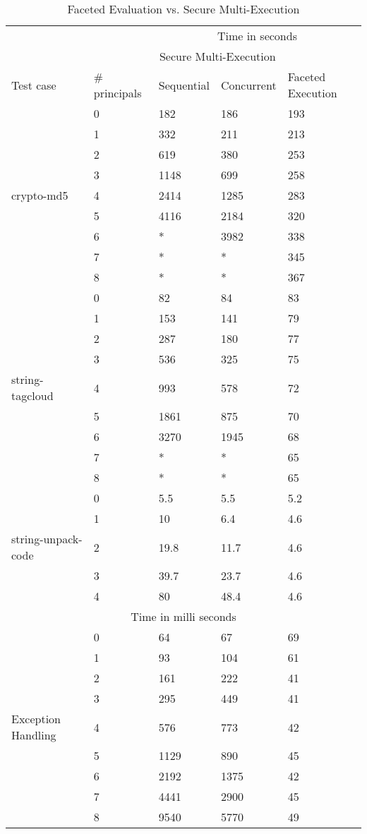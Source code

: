 \begin{table}
\begin{tabular}{ |p{3cm}|p{2cm}|p{2cm}|p{2cm}|p{3cm}| }
 \hline
  	 & 	& \multicolumn{3}{|c|}{Time in seconds} \\ \cline{3-5}
  	&	&\multicolumn{2}{|c|}{\footnotesize Secure Multi-Execution}& \\ \cline{3-4}
  	 \footnotesize Test case & \footnotesize \# principals	&\footnotesize Sequential &\footnotesize Concurrent&	\footnotesize Faceted Execution\\
 \hline
    			&0    	&182		&186		&193\\
 			&1  		&332   	&211		&213\\
 			&2 		&619		&380		&253\\
  			&3 		&1148	&699		&258\\
 \footnotesize crypto-md5	&4  		&2414	&1285	&283\\
 			&5  		&4116   	&2184	&320\\
 			&6  		&*		&3982	&338\\
 			&7  		&*		&*		&345\\
 			&8  		&*		&*		&367\\
 \hline
    			&0    	&82		&84		&83\\
 			&1  		&153   	&141		&79\\
 			&2 		&287		&180		&77\\
  			&3 		&536		&325		&75\\
 \footnotesize string-tagcloud		&4  		&993		&578		&72\\
 			&5  		&1861   	&875		&70\\
 			&6  		&3270	&1945	&68\\
 			&7  		&*		&*		&65\\
 			&8  		&*		&*		&65\\
 \hline
    			&0    	&5.5		&5.5		&5.2\\
 			&1  		&10   	&6.4		&4.6\\
 \footnotesize string-unpack-code	&2 		&19.8	&11.7	&4.6\\
  			&3 		&39.7	&23.7	&4.6\\
 			&4  		&80	&48.4	&4.6\\
 \hline
 	\multicolumn{5}{|c|}{Time in milli seconds} \\	
 \hline
    			&0    	&64		&67		&69\\
 			&1  		&93   	&104		&61\\
 			&2 		&161		&222		&41\\
  			&3 		&295		&449		&41\\
 \footnotesize Exception Handling	&4  		&576		&773		&42\\
 			&5  		&1129   	&890		&45\\
 			&6  		&2192	&1375	&42\\
 			&7  		&4441		&2900		&45\\
 			&8  		&9540		&5770		&49\\
 \hline
\end{tabular}
\caption[Faceted Evaluation vs. Secure Multi-Execution]{Faceted Evaluation vs. Secure Multi-Execution } 
\label{tab:results}
\end{table}
